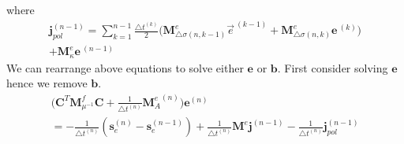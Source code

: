 \documentclass[extra,mreferee]{gji}
\newcommand{\dsig}{\triangle\sigma}
\newcommand{\dcurl}{{\mathbf C}}
\newcommand{\M}{{\mathbf M}}
\newcommand{\MfMui}{{\M^f_{\mu^{-1}}}}
\newcommand{\Me}{{\M^e}}
\newcommand{\Mes}[1]{{\M^e_{#1}}}
\newcommand {\e}  { {\vec e} }
\renewcommand {\dj}  { {\mathbf{j} } }
\newcommand {\db}  { {\mathbf{b} } }
\newcommand {\de}  { {\mathbf{e} } }
\begin{document}
where
\begin{align}
  \dj_{pol}^{(n-1)} = \sum_{k=1}^{n-1} \frac{\triangle t^{(k)}}{2} \Big(\Mes{\dsig (n, k-1)} \e^{\ (k-1)} + \Mes{\dsig (n, k)} \de^{\ (k)} \Big) \nonumber \\
  +  \Mes{\kappa} \de^{\ (n-1)}
\end{align}
We can rearrange above equations to solve either $\de$ or $\db$. First consider solving $\de$ hence we remove $\db$.
\begin{align}
  \Big(\dcurl^T \MfMui \dcurl + \frac{1}{\triangle t^{(n)}} \Mes{A}^{(n)}\Big) \de^{(n)} \nonumber \\
  = - \frac{1}{\triangle t^{(n)}} (\mathbf{s}_e^{(n)}-\mathbf{s}_e^{(n-1)})
    + \frac{1}{\triangle t^{(n)}} \Me \dj^{(n-1)} - \frac{1}{\triangle t^{(n)}} \dj_{pol}^{(n-1)}
\end{align}
\end{document}
